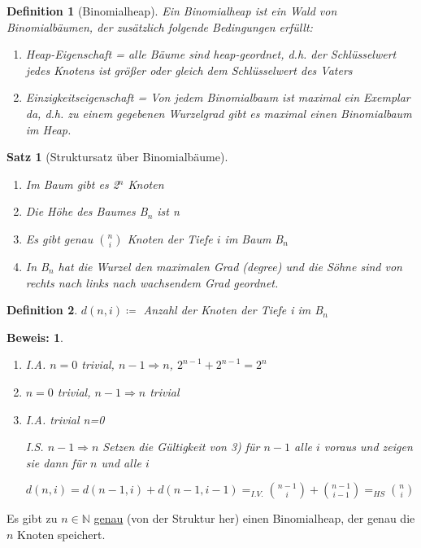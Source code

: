 \documentclass[ngerman,draft,parskip=half*,twoside]{scrreprt}
\theoremstyle{break}
\newtheorem{satz}{Satz}[chapter]
\newtheorem{definition}{Definition}[chapter]
\theoremstyle{nonumberbreak}
\newtheorem{beweis}{Beweis:}
\newcommand*{\N}{\mathbb{N}}        %
\begin{document}
\begin{definition}[Binomialheap]  
Ein Binomialheap ist ein Wald von Binomialbäumen, der zusätzlich folgende Bedingungen erfüllt:
\begin{enumerate}
\item Heap-Eigenschaft = alle Bäume sind heap-geordnet, d.h. der Schlüsselwert jedes Knotens ist größer oder gleich dem
Schlüsselwert des Vaters
\item Einzigkeitseigenschaft = Von jedem Binomialbaum ist maximal ein Exemplar da, d.h. zu einem gegebenen Wurzelgrad
gibt es maximal einen Binomialbaum im Heap.
\end{enumerate}
\end{definition}

\begin{satz}[Struktursatz über Binomialbäume]
\begin{enumerate}
\item Im Baum gibt es 2$^n$ Knoten
\item Die Höhe des Baumes B$_n$ ist n
\item Es gibt genau $\binom{n}{i}$ Knoten der Tiefe $i$ im Baum B$_n$
\item In B$_n$ hat die Wurzel den maximalen Grad (degree) und die Söhne sind von rechts nach links nach wachsendem Grad
geordnet.
\end{enumerate}
\end{satz}

\begin{definition}
$d(n,i)\coloneqq $ Anzahl der Knoten der Tiefe i im B$_n$
\end{definition}

\begin{beweis}
\begin{enumerate}
\item I.A. $n=0$ trivial, $n-1 \Rightarrow n$, $2^{n-1}+2^{n-1}=2^n$ 
\item $n=0$ trivial, $n-1 \Rightarrow n$ trivial
\item 

I.A. trivial n=0

I.S. $n-1 \Rightarrow n$ Setzen die Gültigkeit von 3) für $n-1$ alle $i$ voraus und zeigen sie dann für $n$ und alle
$i$

$d(n,i)=d(n-1,i)+d(n-1,i-1)=_{I.V.} \binom{n-1}{i}+ \binom{n-1}{i-1}=_{HS} \binom{n}{i}$
\end{enumerate}
\end{beweis}

Es gibt zu $n \in \N$ \underline{genau} (von der Struktur her) einen Binomialheap, der genau die $n$ Knoten
speichert.
 
\end{document}
